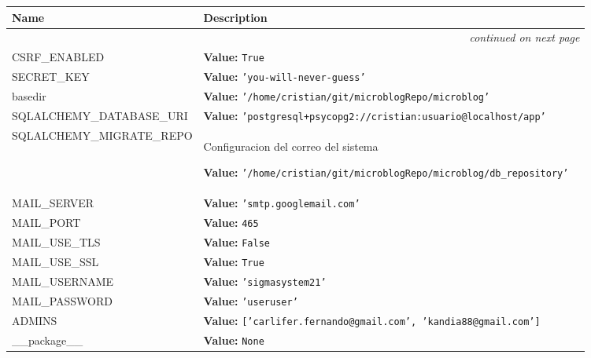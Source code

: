     \vspace{-1cm}
\hspace{\varindent}\begin{longtable}{|p{\varnamewidth}|p{\vardescrwidth}|l}
\cline{1-2}
\cline{1-2} \centering \textbf{Name} & \centering \textbf{Description}& \\
\cline{1-2}
\endhead\cline{1-2}\multicolumn{3}{r}{\small\textit{continued on next page}}\\\endfoot\cline{1-2}
\endlastfoot\raggedright C\-S\-R\-F\-\_\-E\-N\-A\-B\-L\-E\-D\- & \raggedright \textbf{Value:} 
{\tt True}&\\
\cline{1-2}
\raggedright S\-E\-C\-R\-E\-T\-\_\-K\-E\-Y\- & \raggedright \textbf{Value:} 
{\tt \texttt{'}\texttt{you-will-never-guess}\texttt{'}}&\\
\cline{1-2}
\raggedright b\-a\-s\-e\-d\-i\-r\- & \raggedright \textbf{Value:} 
{\tt \texttt{'}\texttt{/home/cristian/git/microblogRepo/microblog}\texttt{'}}&\\
\cline{1-2}
\raggedright S\-Q\-L\-A\-L\-C\-H\-E\-M\-Y\-\_\-D\-A\-T\-A\-B\-A\-S\-E\-\_\-U\-R\-I\- & \raggedright \textbf{Value:} 
{\tt \texttt{'}\texttt{postgresql+psycopg2://cristian:usuario@localhost/app}\texttt{'}}&\\
\cline{1-2}
\raggedright S\-Q\-L\-A\-L\-C\-H\-E\-M\-Y\-\_\-M\-I\-G\-R\-A\-T\-E\-\_\-R\-E\-P\-O\- & \raggedright Configuracion del correo del sistema

\textbf{Value:} 
{\tt \texttt{'}\texttt{/home/cristian/git/microblogRepo/microblog/db\_repository}\texttt{'}}&\\
\cline{1-2}
\raggedright M\-A\-I\-L\-\_\-S\-E\-R\-V\-E\-R\- & \raggedright \textbf{Value:} 
{\tt \texttt{'}\texttt{smtp.googlemail.com}\texttt{'}}&\\
\cline{1-2}
\raggedright M\-A\-I\-L\-\_\-P\-O\-R\-T\- & \raggedright \textbf{Value:} 
{\tt 465}&\\
\cline{1-2}
\raggedright M\-A\-I\-L\-\_\-U\-S\-E\-\_\-T\-L\-S\- & \raggedright \textbf{Value:} 
{\tt False}&\\
\cline{1-2}
\raggedright M\-A\-I\-L\-\_\-U\-S\-E\-\_\-S\-S\-L\- & \raggedright \textbf{Value:} 
{\tt True}&\\
\cline{1-2}
\raggedright M\-A\-I\-L\-\_\-U\-S\-E\-R\-N\-A\-M\-E\- & \raggedright \textbf{Value:} 
{\tt \texttt{'}\texttt{sigmasystem21}\texttt{'}}&\\
\cline{1-2}
\raggedright M\-A\-I\-L\-\_\-P\-A\-S\-S\-W\-O\-R\-D\- & \raggedright \textbf{Value:} 
{\tt \texttt{'}\texttt{useruser}\texttt{'}}&\\
\cline{1-2}
\raggedright A\-D\-M\-I\-N\-S\- & \raggedright \textbf{Value:} 
{\tt \texttt{[}\texttt{'}\texttt{carlifer.fernando@gmail.com}\texttt{'}\texttt{, }\texttt{'}\texttt{kandia88@gmail.com}\texttt{'}\texttt{]}}&\\
\cline{1-2}
\raggedright \_\-\_\-p\-a\-c\-k\-a\-g\-e\-\_\-\_\- & \raggedright \textbf{Value:} 
{\tt None}&\\
\cline{1-2}
\end{longtable}

